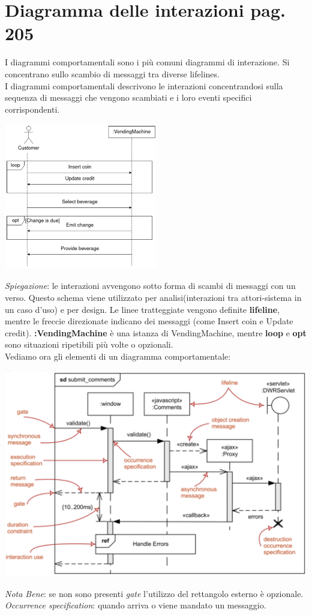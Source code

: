 \documentclass{article}
\begin{document}
\pagestyle{empty}

\section*{Diagramma delle interazioni pag. 205}
\large
I diagrammi comportamentali sono i più comuni diagrammi di interazione. Si concentrano sullo scambio di messaggi tra diverse lifelines.\\
I diagrammi comportamentali descrivono le interazioni concentrandosi sulla sequenza di messaggi che vengono scambiati e i loro eventi specifici corrispondenti.
\begin{center}
    \includegraphics[width=0.5\textwidth]{foto 2.png}
\end{center}
\textit{Spiegazione}: le interazioni avvengono sotto forma di scambi di messaggi con un verso. Questo schema viene utilizzato per analisi(interazioni tra attori-sistema in un caso d'uso) e per design. Le linee tratteggiate vengono definite \textbf{lifeline}, mentre le freccie direzionate indicano dei messaggi (come Insert coin e Update credit). \textbf{:VendingMachine} è una istanza di VendingMachine, mentre \textbf{loop} e \textbf{opt} sono situazioni ripetibili più volte o opzionali.\\
Vediamo ora gli elementi di un diagramma comportamentale:
\begin{center}
    \includegraphics[width=1\textwidth]{foto 3.png}
\end{center}
\textit{Nota Bene}: se non sono presenti \textit{gate} l'utilizzo del rettangolo esterno è opzionale.\\
\textit{Occurrence specification}: quando arriva o viene mandato un messaggio.
\end{document}
